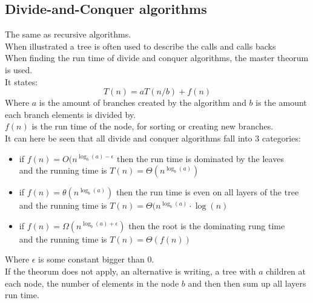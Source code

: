 \documentclass[12pt, a4paper]{article}
\begin{document}
			\subsection{Divide-and-Conquer algorithms}
				The same as recursive algorithms.\\
				When illustrated a tree is often used to describe the calls and calls backs\\
				When finding the run time of divide and conquer algorithms, the master theorum is used.\\
				It states:
				$$T(n)=aT(n/b)+f(n)$$
				Where $a$ is the amount of branches created by the algorithm and $b$ is the amount each branch elements is divided by.\\
				$f(n)$ is the run time of the node, for sorting or creating new branches.\\
				It can here be seen that all divide and conquer algorithms fall into 3 categories:
				\begin{itemize}
					\item if $f(n)=O(n^{\log_b(a)-\epsilon}$ then the run time is dominated by the leaves\\
							  and the running time is $T(n)=\Theta(n^{\log_b(a)})$
					\item if $f(n)=\theta(n^{\log_b(a)})$ then the run time is even on all layers of the tree\\
						and the running time is $T(n)=\Theta(n^{\log_b(a)}\cdot \log(n)$
			 		\item if $f(n)=\Omega(n^{\log_b(a)+\epsilon})$ then the root is the dominating rung time\\
							  and the running time is $T(n)=\Theta(f(n))$
				\end{itemize}
				Where $\epsilon$ is some constant bigger than 0.\\
				If the theorum does not apply, an alternative is writing, a tree with $a$ children at each node, the number of elements in the node $b$ and then then sum up all layers run time.
\end{document}
